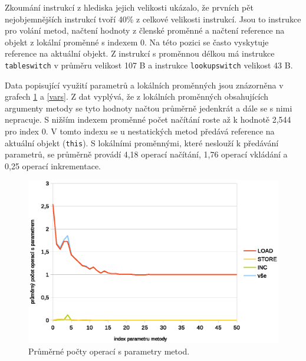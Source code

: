 Zkoumání instrukcí z hlediska jejich velikosti ukázalo, že prvních pět nejobjemnějších instrukcí tvoří 40\% z celkové velikosti instrukcí. Jsou to instrukce pro volání metod, načtení hodnoty z členské proměnné a načtení reference na objekt z lokální proměnné s indexem 0. Na této pozici se často vyskytuje reference na aktuální objekt. Z instrukcí s proměnnou délkou má instrukce \texttt{tableswitch} v průměru velikost 107 B a instrukce \texttt{lookupswitch} velikost 43 B.


Data popisující využití parametrů a lokálních proměnných jsou znázorněna v grafech \ref{params} a \ref{vars}. Z dat vyplývá, že z lokálních proměnných obsahujících argumenty metody se tyto hodnoty načtou průměrně jedenkrát a dále se s nimi nepracuje. S nižším indexem proměnné počet načítání roste až k hodnotě 2,544 pro index 0. V tomto indexu se u nestatických metod předává reference na aktuální objekt (\texttt{this}). S lokálními proměnnými, které neslouží k předávání parametrů, se průměrně provádí 4,18 operací načítání, 1,76 operací vkládání a 0,25 operací inkrementace.

\begin{figure}[h!]
\centering
\includegraphics[scale=0.9]{fig/params}
\caption{Průměrné počty operací s parametry metod.}\label{params}
\end{figure}

